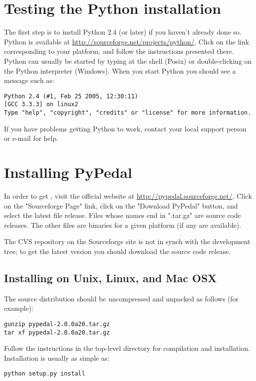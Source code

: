 \section{Testing the Python installation}
The first step is to install Python 2.4 (or later) if you haven't already done so. Python is available at
\url{http://sourceforge.net/projects/python/}.  Click on the link corresponding to your platform, and follow the instructions
presented there. Python can usually be started by typing  at the shell (Posix) or double-clicking on the Python interpreter (Windows).  When you start Python you should see a message such as:
\begin{verbatim}
Python 2.4 (#1, Feb 25 2005, 12:30:11)
[GCC 3.3.3] on linux2
Type "help", "copyright", "credits" or "license" for more information.
\end{verbatim}
If you have problems getting Python to work, contact your local support person or e-mail   for help.
\section{Installing PyPedal}
\label{sec:installing-pypedal}
In order to get \PyPedal{}, visit the official website at \url{http://pypedal.sourceforge.net/}.  Click on the "Sourceforge Page" link, click on the "Download PyPedal" button, and select the latest file release. Files whose names end in ".tar.gz" are source code releases. The other files are binaries for a given platform (if any are available).

The CVS repository on the Sourceforge site is not in synch with the development tree; to get the latest version you should download the source code release.
\subsection{Installing on Unix, Linux, and Mac OSX}
\label{sec:installing-unix}
The source distribution should be uncompressed and unpacked as follows (for example):
\begin{verbatim}
gunzip pypedal-2.0.0a20.tar.gz
tar xf pypedal-2.0.0a20.tar.gz
\end{verbatim}
Follow the instructions in the top-level directory for compilation and installation. Installation is usually as simple as:
\begin{verbatim}
python setup.py install
\end{verbatim}
